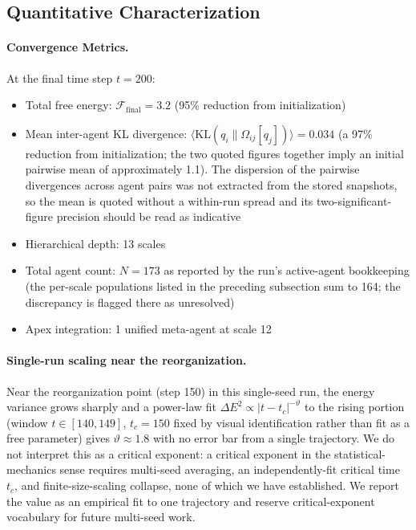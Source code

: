 \documentclass[11pt]{article}
\begin{document}
\subsection{Quantitative Characterization}

\paragraph{Convergence Metrics.}
At the final time step $t = 200$:
\begin{itemize}
\item Total free energy: $\mathcal{F}_{\text{final}} = 3.2$ (95\% reduction from initialization)
\item Mean inter-agent KL divergence: $\langle\mathrm{KL}(q_i\|\Omega_{ij}[q_j])\rangle = 0.034$ (a 97\% reduction from initialization; the two quoted figures together imply an initial pairwise mean of approximately 1.1). The dispersion of the pairwise divergences across agent pairs was not extracted from the stored snapshots, so the mean is quoted without a within-run spread and its two-significant-figure precision should be read as indicative
\item Hierarchical depth: 13 scales
\item Total agent count: $N = 173$ as reported by the run's active-agent bookkeeping (the per-scale populations listed in the preceding subsection sum to 164; the discrepancy is flagged there as unresolved)
\item Apex integration: 1 unified meta-agent at scale 12
\end{itemize}

\paragraph{Single-run scaling near the reorganization.}
Near the reorganization point (step 150) in this single-seed run, the energy variance grows sharply and a power-law fit $\Delta E^2 \propto |t - t_c|^{-\vartheta}$ to the rising portion (window $t \in [140, 149]$, $t_c = 150$ fixed by visual identification rather than fit as a free parameter) gives $\vartheta \approx 1.8$ with no error bar from a single trajectory. We do not interpret this as a critical exponent: a critical exponent in the statistical-mechanics sense requires multi-seed averaging, an independently-fit critical time $t_c$, and finite-size-scaling collapse, none of which we have established. We report the value as an empirical fit to one trajectory and reserve critical-exponent vocabulary for future multi-seed work.
\end{document}
